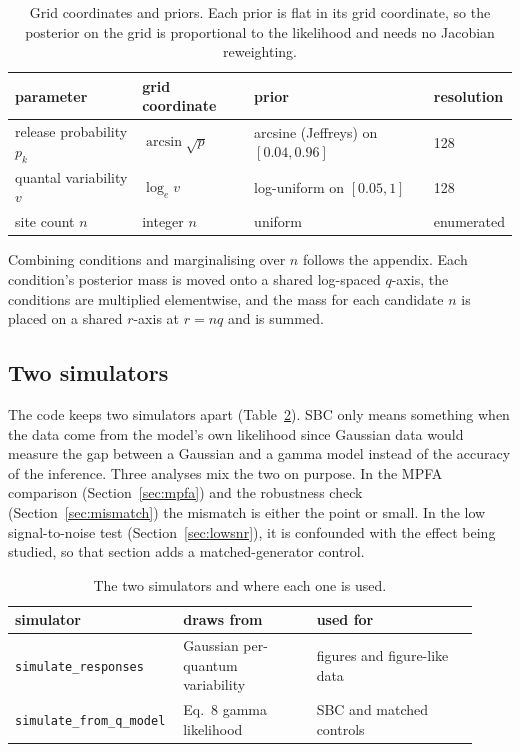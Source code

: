 \documentclass[a4paper, oneside, 10pt]{article}
\begin{document}
\begin{table}[!htb]
\centering
\caption{Grid coordinates and priors. Each prior is flat in its grid coordinate, so the posterior on the grid is proportional to the likelihood and needs no Jacobian reweighting.}
\label{tab:grid}
\begin{tabular}{@{}llll@{}}
\toprule
parameter & grid coordinate & prior & resolution \\
\midrule
release probability \(p_k\) & \(\arcsin\sqrt{p}\) & arcsine (Jeffreys) on \([0.04, 0.96]\) & 128 \\
quantal variability \(v\) & \(\log_e v\) & log-uniform on \([0.05, 1]\) & 128 \\
site count \(n\) & integer \(n\) & uniform & enumerated \\
\bottomrule
\end{tabular}
\end{table}

Combining conditions and marginalising over \(n\) follows the appendix. Each condition's posterior mass is moved onto a shared log-spaced \(q\)-axis, the conditions are multiplied elementwise, and the mass for each candidate \(n\) is placed on a shared \(r\)-axis at \(r = nq\) and is summed.

\subsection{Two simulators}

The code keeps two simulators apart (Table~\ref{tab:sims}). SBC only means something when the data come from the model's own likelihood since Gaussian data would measure the gap between a Gaussian and a gamma model instead of the accuracy of the inference. Three analyses mix the two on purpose. In the MPFA comparison (Section~\ref{sec:mpfa}) and the robustness check (Section~\ref{sec:mismatch}) the mismatch is either the point or small. In the low signal-to-noise test (Section~\ref{sec:lowsnr}), it is confounded with the effect being studied, so that section adds a matched-generator control.

\begin{table}[!htb]
\centering
\caption{The two simulators and where each one is used.}
\label{tab:sims}
\begin{tabular}{@{}>{\raggedright\arraybackslash}p{0.30\linewidth}
>{\raggedright\arraybackslash}p{0.28\linewidth}
>{\raggedright\arraybackslash}p{0.34\linewidth}@{}}
\toprule
simulator & draws from & used for \\
\midrule
\texttt{simulate\_responses} & Gaussian per-quantum variability & figures and figure-like data \\
\texttt{simulate\_from\_q\_model} & Eq.~8 gamma likelihood & SBC and matched controls \\
\bottomrule
\end{tabular}
\end{table}
\end{document}
